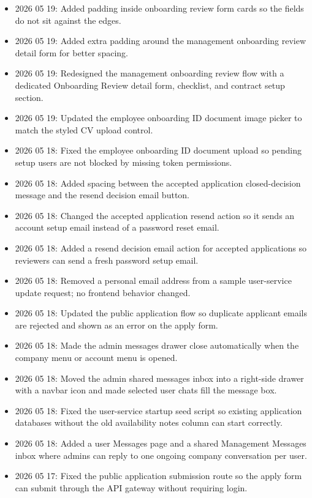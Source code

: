 \documentclass[11pt]{article}
\begin{document}
\begin{itemize}
    \item 2026 05 19: Added padding inside onboarding review form cards so the fields do not sit against the edges.
    \item 2026 05 19: Added extra padding around the management onboarding review detail form for better spacing.
    \item 2026 05 19: Redesigned the management onboarding review flow with a dedicated Onboarding Review detail form, checklist, and contract setup section.
    \item 2026 05 19: Updated the employee onboarding ID document image picker to match the styled CV upload control.
    \item 2026 05 18: Fixed the employee onboarding ID document upload so pending setup users are not blocked by missing token permissions.
    \item 2026 05 18: Added spacing between the accepted application closed-decision message and the resend decision email button.
    \item 2026 05 18: Changed the accepted application resend action so it sends an account setup email instead of a password reset email.
    \item 2026 05 18: Added a resend decision email action for accepted applications so reviewers can send a fresh password setup email.
    \item 2026 05 18: Removed a personal email address from a sample user-service update request; no frontend behavior changed.
    \item 2026 05 18: Updated the public application flow so duplicate applicant emails are rejected and shown as an error on the apply form.
    \item 2026 05 18: Made the admin messages drawer close automatically when the company menu or account menu is opened.
    \item 2026 05 18: Moved the admin shared messages inbox into a right-side drawer with a navbar icon and made selected user chats fill the message box.
    \item 2026 05 18: Fixed the user-service startup seed script so existing application databases without the old availability notes column can start correctly.
    \item 2026 05 18: Added a user Messages page and a shared Management Messages inbox where admins can reply to one ongoing company conversation per user.
    \item 2026 05 17: Fixed the public application submission route so the apply form can submit through the API gateway without requiring login.

\end{itemize}
\end{document}
